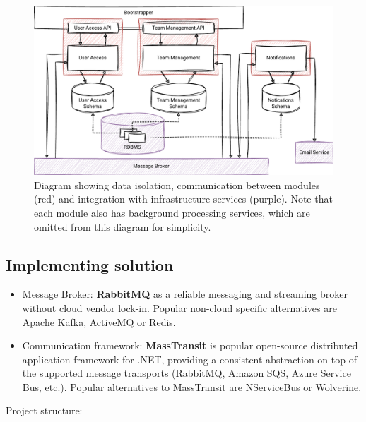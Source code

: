 \begin{figure} [H]
    \centering
    \includegraphics[width=\textwidth]{figures/mm-design.pdf}
    \caption{Diagram showing data isolation, communication between modules (red) and integration with infrastructure services (purple). Note that each module also has background processing services, which are omitted from this diagram for simplicity.}
    \label{fig:mm_design}
\end{figure}

\subsection{Implementing solution}

\begin{itemize}
    \item Message Broker: \textbf{RabbitMQ} as a reliable messaging and streaming broker without cloud vendor lock-in. Popular non-cloud specific alternatives are Apache Kafka, ActiveMQ or Redis. 
    \item Communication framework: \textbf{MassTransit} is popular open-source distributed application framework for .NET, providing a consistent abstraction on top of the supported message transports (RabbitMQ, Amazon SQS, Azure Service Bus, etc.). Popular alternatives to MassTransit are NServiceBus or Wolverine.
\end{itemize}

Project structure: \vspace{6pt}


